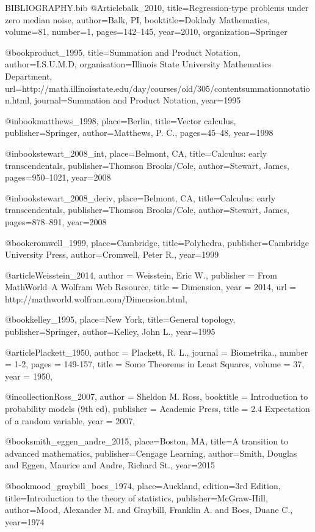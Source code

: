 \RequirePackage{filecontents}
\begin{filecontents}{BIBLIOGRAPHY.bib}
@Article{balk_2010,
  title={Regression-type problems under zero median noise},
  author={Balk, PI},
  booktitle={Doklady Mathematics},
  volume={81},
  number={1},
  pages={142--145},
  year={2010},
  organization={Springer}
}

@book{product_1995, 
 title={Summation and Product Notation},
 author={I.S.U.M.D},
 organisation={Illinois State University Mathematics Department},
 url={http://math.illinoisstate.edu/day/courses/old/305/contentsummationnotation.html},  
 journal={Summation and Product Notation}, 
 year={1995}}
 
 @inbook{matthews_1998, 
 place={Berlin}, 
 title={Vector calculus}, 
 publisher={Springer}, 
 author={Matthews, P. C.}, 
 pages={45--48},
 year={1998}}


@inbook{stewart_2008_int, 
 place={Belmont, CA}, 
 title={Calculus: early transcendentals}, 
 publisher={Thomson Brooks/Cole}, 
 author={Stewart, James}, 
 pages={950--1021},
 year={2008}}
 
 @inbook{stewart_2008_deriv, 
 place={Belmont, CA}, 
 title={Calculus: early transcendentals}, 
 publisher={Thomson Brooks/Cole}, 
 author={Stewart, James}, 
 pages={878--891},
 year={2008}}
 
@book{cromwell_1999, 
 place={Cambridge}, 
 title={Polyhedra}, 
 publisher={Cambridge University Press}, 
 author={Cromwell, Peter R.}, 
 year={1999}}
 
 @article{Weisstein_2014,
author = {Weisstein, Eric W.},
publisher = {From MathWorld--A Wolfram Web Resource},
title = {Dimension},
year = {2014},
url = {http://mathworld.wolfram.com/Dimension.html},
}

@book{kelley_1995, 
 place={New York}, 
 title={General topology}, 
 publisher={Springer}, 
 author={Kelley, John L.}, 
 year={1995}}
 
 @article{Plackett_1950,
author = {Plackett, R. L.},
journal = {Biometrika.},
number = {1-2},
pages = {149-157},
title = {Some Theorems in Least Squares},
volume = {37},
year = {1950},
}

@incollection{Ross_2007,
author = {Sheldon M. Ross},
booktitle = {Introduction to probability models (9th ed)},
publisher = {Academic Press},
title = {2.4 Expectation of a random variable},
year = {2007},
}

@book{smith_eggen_andre_2015,
place={Boston, MA}, 
title={A transition to advanced mathematics}, 
publisher={Cengage Learning}, 
author={Smith, Douglas and Eggen, Maurice and Andre, Richard St.}, 
year={2015}}

@book{mood_graybill_boes_1974, 
place={Auckland}, 
edition={3rd Edition}, 
title={Introduction to the theory of statistics}, 
publisher={McGraw-Hill}, 
author={Mood, Alexander M. and Graybill, Franklin A. and Boes, Duane C.}, 
year={1974}}

\end{filecontents}

